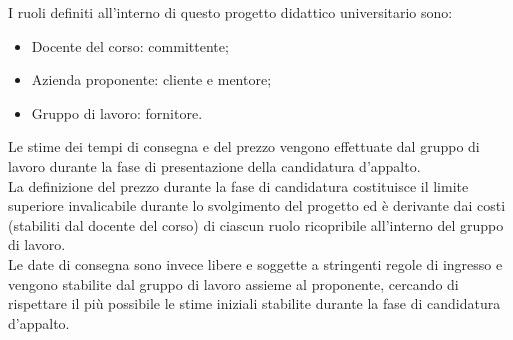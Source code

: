 \documentclass[10pt, a4paper]{article}
\begin{document}
I ruoli definiti all'interno di questo progetto didattico universitario sono:
\begin{itemize}
    \item Docente del corso: committente;
    \item Azienda proponente: cliente e mentore;
    \item Gruppo di lavoro: fornitore. 
\end{itemize}
Le stime dei tempi di consegna e del prezzo vengono effettuate dal gruppo di lavoro durante la fase di presentazione della candidatura d'appalto.\\
La definizione del prezzo durante la fase di candidatura costituisce il limite superiore invalicabile durante lo svolgimento del progetto ed
è derivante dai costi (stabiliti dal docente del corso) di ciascun ruolo ricopribile all'interno del gruppo di lavoro.\\
Le date di consegna sono invece libere e soggette a stringenti regole di ingresso e vengono stabilite dal gruppo di lavoro assieme al proponente,
cercando di rispettare il più possibile le stime iniziali stabilite durante la fase di candidatura d'appalto.
\end{document}
